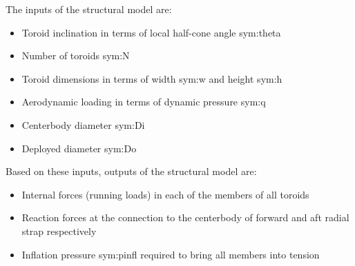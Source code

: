 The inputs of the structural model are:
\begin{itemize}
\item Toroid inclination in terms of local half-cone angle \gls{sym:theta}
\item Number of toroids \gls{sym:N}
\item Toroid dimensions in terms of width \gls{sym:w} and height \gls{sym:h}
\item Aerodynamic loading in terms of dynamic pressure \gls{sym:q}
\item Centerbody diameter \gls{sym:Di}
\item Deployed diameter \gls{sym:Do}
\end{itemize}
Based on these inputs, outputs of the structural model are:
\begin{itemize}
\item Internal forces (running loads) in each of the members of all toroids
\item Reaction forces at the connection to the centerbody of forward and aft radial strap respectively
\item Inflation pressure \gls{sym:pinfl} required to bring all members into tension
\end{itemize}
